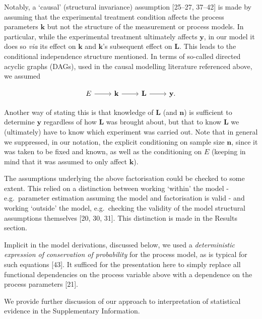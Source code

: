 \documentclass[10pt,letterpaper]{article}
\begin{document}
Notably, a `causal' (structural invariance) assumption {[}25--27,
37--42{]} is made by assuming that the experimental treatment condition
affects the process parameters \(\mathbf{k}\) but not the structure of
the measurement or process models. In particular, while the experimental
treatment ultimately affects \(\mathbf{y}\), in our model it does so
\emph{via} its effect on \(\mathbf{k}\) and \(\mathbf{k}\)'s subsequent
effect on \(\mathbf{L}\). This leads to the conditional independence
structure mentioned. In terms of so-called directed acyclic graphs
(DAGs), used in the causal modelling literature referenced above, we
assumed

\begin{equation}
\begin{tikzcd}
E \arrow[r] & \mathbf{k} \arrow[r] & \mathbf{L} \arrow[r] & \mathbf{y}. 
\end{tikzcd}
\label{eq:dag}\end{equation}

Another way of stating this is that knowledge of \(\mathbf{L}\) (and
\(\mathbf{n}\)) is sufficient to determine \(\mathbf{y}\) regardless of
how \(\mathbf{L}\) was brought about, but that to know \(\mathbf{L}\) we
(ultimately) have to know which experiment was carried out. Note that in
general we suppressed, in our notation, the explicit conditioning on
sample size \(\mathbf{n}\), since it was taken to be fixed and known, as
well as the conditioning on \(E\) (keeping in mind that it was assumed
to only affect \(\mathbf{k}\)).

The assumptions underlying the above factorisation could be checked to
some extent. This relied on a distinction between working `within' the
model - e.g.~parameter estimation assuming the model and factorisation
is valid - and working `outside' the model, e.g.~checking the validity
of the model structural assumptions themselves {[}20, 30, 31{]}. This
distinction is made in the Results section.

Implicit in the model derivations, discussed below, we used a
\emph{deterministic expression of conservation of probability} for the
process model, as is typical for such equations {[}43{]}. It sufficed
for the presentation here to simply replace all functional dependencies
on the process variable above with a dependence on the process
parameters {[}21{]}.

We provide further discussion of our approach to interpretation of
statistical evidence in the Supplementary Information.
\end{document}
